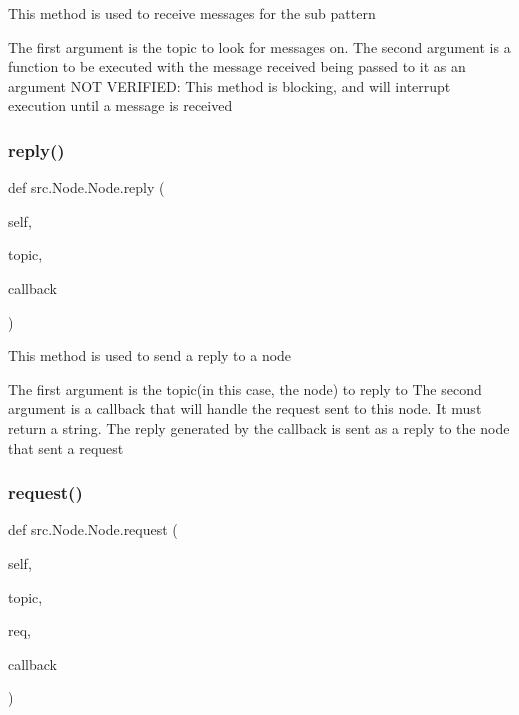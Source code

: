 \begin{DoxyVerb}This method is used to receive messages for the sub pattern

The first argument is the topic to look for messages on.
The second argument is a function to be executed with the message received being passed to it as an argument
NOT VERIFIED: This method is blocking, and will interrupt execution until a message is received
\end{DoxyVerb}
 \mbox{\label{classsrc_1_1_node_1_1_node_a6fee164df1e6f3664f41199258c96810}} 
\subsubsection{\texorpdfstring{reply()}{reply()}}
{\footnotesize\ttfamily def src.\+Node.\+Node.\+reply (\begin{DoxyParamCaption}\item[{}]{self,  }\item[{}]{topic,  }\item[{}]{callback }\end{DoxyParamCaption})}

\begin{DoxyVerb}This method is used to send a reply to a node

The first argument is the topic(in this case, the node) to reply to
The second argument is a callback that will handle the request sent to this node. It must return a string.
The reply generated by the callback is sent as a reply to the node that sent a request
\end{DoxyVerb}
 \mbox{\label{classsrc_1_1_node_1_1_node_ac92e0c1099d7fc66a6a2506ea03407d1}} 
\subsubsection{\texorpdfstring{request()}{request()}}
{\footnotesize\ttfamily def src.\+Node.\+Node.\+request (\begin{DoxyParamCaption}\item[{}]{self,  }\item[{}]{topic,  }\item[{}]{req,  }\item[{}]{callback }\end{DoxyParamCaption})}


